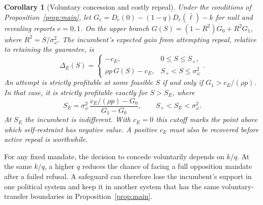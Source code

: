 \documentclass[11pt,letterpaper]{article}
\newtheorem{corollary}{Corollary}
\begin{document}
\begin{corollary}[Voluntary concession and costly repeal]\label{cor:repeal}
Under the conditions of Proposition~\ref{prop:main}, let $G_e=D_e(0)-(1-q)D_e(\bar\ell)-k$ for null and revealing reports $e=0,1$. On the upper branch $G(S)=(1-R^2)G_0+R^2G_1$, where $R^2=S/\sigma_\omega^2$. The incumbent's expected gain from attempting repeal, relative to retaining the guarantee, is
\begin{equation}
 \Delta_E(S)=\begin{cases}
 -c_E, & 0\le S\le S_+,\\
 \rho p\,G(S)-c_E, & S_+<S\le \sigma_\omega^2
 \end{cases}.
 \label{eq:repealnet}
\end{equation}
An attempt is strictly profitable at some feasible $S$ if and only if $G_1>c_E/(\rho p)$. In that case, it is strictly profitable exactly for $S>S_E$, where
\begin{equation}
 S_E=\sigma_\omega^2\,\frac{c_E/(\rho p)-G_0}{G_1-G_0},
 \qquad S_+<S_E<\sigma_\omega^2 .
 \label{eq:repealcut}
\end{equation}
At $S_E$ the incumbent is indifferent. With $c_E=0$ this cutoff marks the point above which self-restraint has negative value. A positive $c_E$ must also be recovered before active repeal is worthwhile.
\end{corollary}

For any fixed mandate, the decision to concede voluntarily depends on $k/q$. At the same $k/q$, a higher $q$ reduces the chance of facing a full opposition mandate after a failed refusal. A safeguard can therefore lose the incumbent's support in one political system and keep it in another system that has the same voluntary-transfer boundaries in Proposition~\ref{prop:main}.
\end{document}
